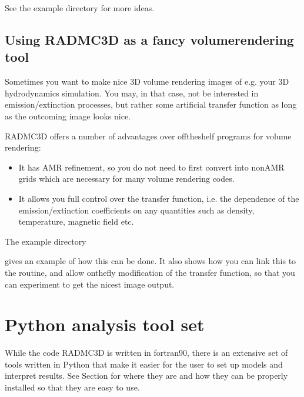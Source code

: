 \documentclass[letterpaper,10pt,english]{sphinxmanual}
\begin{document}
See the example directory  for
more ideas.


\section{Using RADMC\sphinxhyphen{}3D as a fancy volume\sphinxhyphen{}rendering tool}
\label{\detokenize{internalsetup:using-radmc-3d-as-a-fancy-volume-rendering-tool}}
Sometimes you want to make nice 3\sphinxhyphen{}D volume rendering images of e.g. your
3\sphinxhyphen{}D hydrodynamics simulation. You may, in that case, not be interested in
 emission/extinction processes, but rather some artificial
transfer function \sphinxhyphen{} as long as the outcoming image looks nice.

RADMC\sphinxhyphen{}3D offers a number of advantages over off\sphinxhyphen{}the\sphinxhyphen{}shelf programs for
volume rendering:
\begin{itemize}
\item {} 
It has AMR refinement, so you do not need to first convert into
non\sphinxhyphen{}AMR grids which are necessary for many volume rendering codes.

\item {} 
It allows you full control over the transfer function, i.e. the
dependence of the emission/extinction coefficients on any quantities
such as density, temperature, magnetic field etc.

\end{itemize}

The example directory

\begin{sphinxVerbatim}[commandchars=\\\{\}]
\end{sphinxVerbatim}

gives an example of how this can be done. It also shows how you can link this to
the  routine, and allow on\sphinxhyphen{}the\sphinxhyphen{}fly modification of the transfer
function, so that you can experiment to get the nicest image output.


\chapter{Python analysis tool set}
\label{\detokenize{pythontools:python-analysis-tool-set}}\label{\detokenize{pythontools:chap-python-analysis-tools}}\label{\detokenize{pythontools::doc}}
While the code RADMC\sphinxhyphen{}3D is written in fortran\sphinxhyphen{}90, there is an extensive set
of tools written in Python that make it easier for the user to set up models
and interpret results. See Section {\hyperref[\detokenize{installation:sec-install-pythonscripts}]{}} for where
they are and how they can be properly installed so that they are easy to
use.
\end{document}
